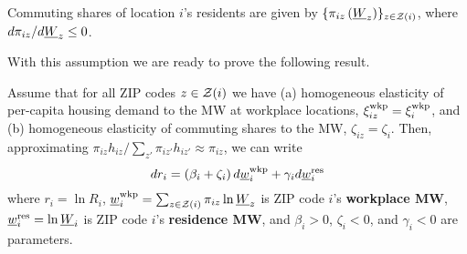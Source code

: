 \begin{assu}\label{assu:commuting_shares}
    Commuting shares of location $i$'s residents are given by 
    $\{\pi_{iz}\left(\underline{W}_z\right)\}_{z\in\mathcal{Z}(i)}$, where $d\pi_{iz}/d\underline{W}_z \leq 0$.
\end{assu}

With this assumption we are ready to prove the following result.

\begin{prop}\label{prop:representation_endog_shares}
    Assume that for all ZIP codes $z\in\mathcal{Z}(i)$ we have
    (a) homogeneous elasticity of per-capita housing demand to the MW 
    at workplace locations,
    $\xi^{\text{wkp}}_{iz}=\xi^{\text{wkp}}_{i}$, and
    (b) homogeneous elasticity of commuting shares to the MW,
    $\zeta_{iz}=\zeta_{i}$.
    Then, approximating $\pi_{iz} h_{iz} / \sum_{z'}\pi_{iz'} h_{iz'}\approx\pi_{iz}$,
    we can write
    $$
    d r_{i} = \left(\beta_i + \zeta_i\right) d \underline{w}_{i}^{\text{wkp}} 
            + \gamma_i d \underline{w}^{\text{res}}_i
    $$
    where 
    $r_{i} = \ln R_i$,
    $\underline{w}_{i}^{\text{wkp}} = \sum_{z\in\mathcal{Z}(i)} \pi_{iz} \ln \underline{W}_z$ 
    is ZIP code $i$'s \textbf{workplace MW}, 
    $\underline{w}^{\text{res}}_i = \ln \underline{W}_i$ 
    is ZIP code $i$'s \textbf{residence MW}, and 
    $\beta_i > 0$, $\zeta_i<0$, and $\gamma_i < 0$ are parameters.
\end{prop}

